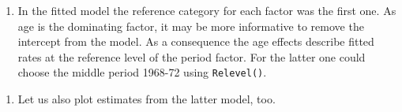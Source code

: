 \documentclass[
]{book}
\newenvironment{Shaded}{\begin{snugshade}}{\end{snugshade}}
\newcommand{\AttributeTok}[1]{\textcolor[rgb]{0.13,0.29,0.53}{#1}}
\newcommand{\DecValTok}[1]{\textcolor[rgb]{0.00,0.00,0.81}{#1}}
\newcommand{\FunctionTok}[1]{\textcolor[rgb]{0.13,0.29,0.53}{\textbf{#1}}}
\newcommand{\NormalTok}[1]{#1}
\newcommand{\OtherTok}[1]{\textcolor[rgb]{0.56,0.35,0.01}{#1}}
\newcommand{\SpecialCharTok}[1]{\textcolor[rgb]{0.81,0.36,0.00}{\textbf{#1}}}
\providecommand{\tightlist}{%
  \setlength{\itemsep}{0pt}\setlength{\parskip}{0pt}}
\begin{document}
\begin{enumerate}
\def\labelenumi{\arabic{enumi}.}
\setcounter{enumi}{2}
\tightlist
\item
  In the fitted model the reference category for each factor was
  the first one. As age is the dominating factor, it may be more
  informative to remove the intercept from the model. As a
  consequence the age effects describe fitted rates at the reference
  level of the period factor. For the latter one could choose the
  middle period 1968-72 using \texttt{Relevel()}.
\end{enumerate}

\begin{Shaded}
\end{Shaded}

\begin{enumerate}
\def\labelenumi{\arabic{enumi}.}
\setcounter{enumi}{3}
\tightlist
\item
  Let us also plot estimates from the latter model, too.
\end{enumerate}
\end{document}
